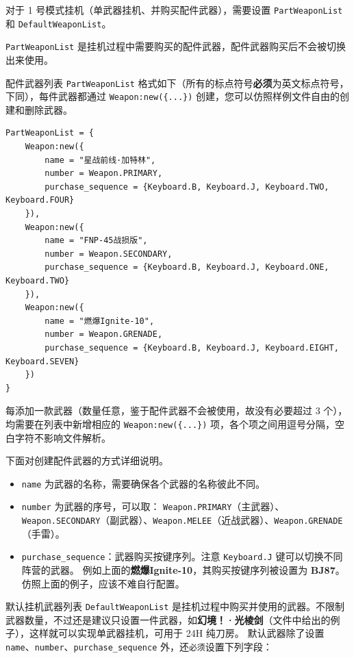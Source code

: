 对于 1 号模式挂机（单武器挂机、并购买配件武器），需要设置 \lstinline{PartWeaponList} 和 \lstinline{DefaultWeaponList}。

\lstinline{PartWeaponList} 是挂机过程中需要购买的配件武器，配件武器购买后不会被切换出来使用。

配件武器列表 \lstinline{PartWeaponList} 格式如下（所有的标点符号\textbf{\color{red}必须}为英文标点符号，下同），每件武器都通过 \lstinline|Weapon:new({...})| 创建，您可以仿照样例文件自由的创建和删除武器。

\begin{verbatim}
PartWeaponList = {
    Weapon:new({
        name = "星战前线·加特林",
        number = Weapon.PRIMARY,
        purchase_sequence = {Keyboard.B, Keyboard.J, Keyboard.TWO, Keyboard.FOUR}
    }),
    Weapon:new({
        name = "FNP-45战损版",
        number = Weapon.SECONDARY,
        purchase_sequence = {Keyboard.B, Keyboard.J, Keyboard.ONE, Keyboard.TWO}
    }),
    Weapon:new({
        name = "燃爆Ignite-10",
        number = Weapon.GRENADE,
        purchase_sequence = {Keyboard.B, Keyboard.J, Keyboard.EIGHT, Keyboard.SEVEN}
    })
}
\end{verbatim}

每添加一款武器（数量任意，鉴于配件武器不会被使用，故没有必要超过 3 个），均需要在列表中新增相应的 \lstinline|Weapon:new({...})| 项，各个项之间用逗号分隔，空白字符不影响文件解析。

下面对创建配件武器的方式详细说明。

\begin{itemize}
\item \lstinline{name} 为武器的名称，需要确保各个武器的名称彼此不同。
\item \lstinline{number} 为武器的序号，可以取：
\lstinline{Weapon.PRIMARY}（主武器）、\lstinline{Weapon.SECONDARY}（副武器）、\lstinline{Weapon.MELEE}（近战武器）、\lstinline{Weapon.GRENADE}（手雷）。
\item \lstinline{purchase_sequence}：武器购买按键序列。注意 \lstinline{Keyboard.J} 键可以切换不同阵营的武器。
例如上面的\textbf{\color{red}燃爆Ignite-10}，其购买按键序列被设置为 \textbf{\color{red}BJ87}。仿照上面的例子，应该不难自行配置。
\end{itemize}

默认挂机武器列表 \lstinline{DefaultWeaponList} 是挂机过程中购买并使用的武器。不限制武器数量，不过还是建议只设置一件武器，如\textbf{\color{red}幻境！·光棱剑}（文件中给出的例子），这样就可以实现单武器挂机，可用于 24H 纯刀房。
默认武器除了设置 \lstinline{name}、\lstinline{number}、\lstinline{purchase_sequence} 外，还\lstinline{必须}设置下列字段：

